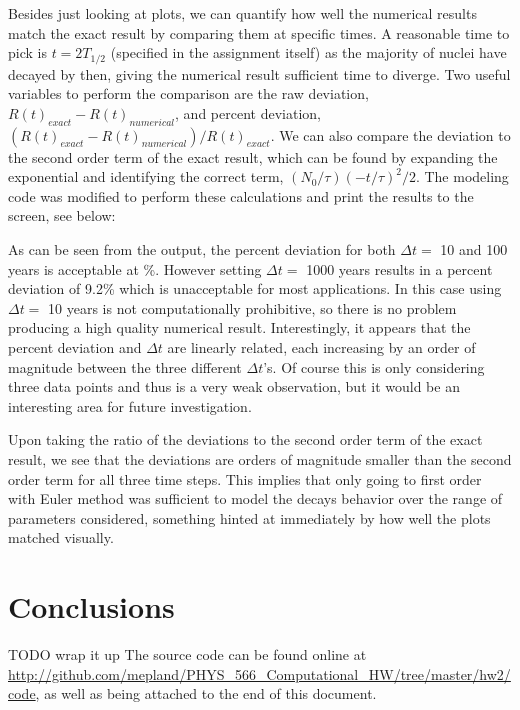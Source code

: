 \documentclass[notitlepage,aps,prd,nofootinbib]{revtex4-1}
\begin{document}
Besides just looking at plots, we can quantify how well the numerical results match the exact result by comparing them at specific times. A reasonable time to pick is $t = 2T_{1/2}$ (specified in the assignment itself) as the majority of nuclei have decayed by then, giving the numerical result sufficient time to diverge. Two useful variables to perform the comparison are the raw deviation, $R\left(t\right)_{exact}-R\left(t\right)_{numerical}$, and percent deviation, $\left(R\left(t\right)_{exact}-R\left(t\right)_{numerical}\right)/R\left(t\right)_{exact}$. We can also compare the deviation to the second order term of the exact result, which can be found by expanding the exponential and identifying the correct term, $\left(N_{0}/\tau\right) \left(-t/\tau\right)^2/2$. The modeling code was modified to perform these calculations and print the results to the screen, see below: %
\newline


As can be seen from the output, the percent deviation for both $\Delta t =$ 10 and 100 years is acceptable at \%. However setting $\Delta t =$ 1000 years results in a percent deviation of 9.2\% which is unacceptable for most applications. In this case using $\Delta t =$ 10 years is not computationally prohibitive, so there is no problem producing a high quality numerical result. Interestingly, it appears that the percent deviation and $\Delta t$ are linearly related, each increasing by an order of magnitude between the three different $\Delta t$'s. Of course this is only considering three data points and thus is a very weak observation, but it would be an interesting area for future investigation.

Upon taking the ratio of the deviations to the second order term of the exact result, we see that the deviations are orders of magnitude smaller than the second order term for all three time steps. This implies that only going to first order with Euler method was sufficient to model the decays behavior over the range of parameters considered, something hinted at immediately by how well the plots matched visually.

\section{Conclusions}
\label{sec:Conclusions}
TODO wrap it up
The source code can be found online at \url{http://github.com/mepland/PHYS_566_Computational_HW/tree/master/hw2/code}, as well as being attached to the end of this document.
\end{document}
